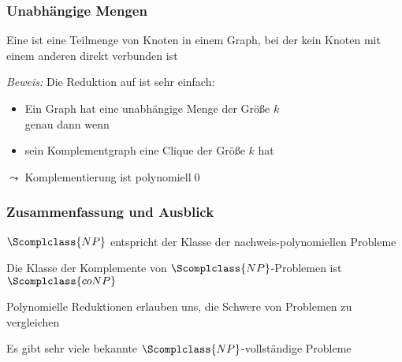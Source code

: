 \documentclass[aspectratio=1610,onlymath]{beamer}
\begin{document}
\begin{frame}\frametitle{Unabhängige Mengen}

Eine  ist eine Teilmenge von Knoten in einem Graph, bei der kein
Knoten mit einem anderen direkt verbunden ist\medskip

\medskip\pause

\pause

\emph{Beweis:} Die Reduktion auf  ist sehr einfach:
\begin{itemize}
\item Ein Graph hat eine unabhängige Menge der Größe $k$\\
genau dann wenn
\item sein Komplementgraph eine Clique der Größe $k$ hat
\end{itemize}
$\leadsto$ Komplementierung ist polynomiell\qed

\end{frame}


\begin{frame}\frametitle{Zusammenfassung und Ausblick}

$\Scomplclass{NP}$ entspricht der Klasse der nachweis-polynomiellen Probleme
\bigskip

Die Klasse der Komplemente von $\Scomplclass{NP}$-Problemen ist $\Scomplclass{coNP}$\bigskip

Polynomielle Reduktionen erlauben uns, die Schwere von Problemen zu vergleichen
\bigskip

Es gibt sehr viele bekannte $\Scomplclass{NP}$-vollständige Probleme\bigskip


\end{frame}

% 
% 
% 
% 
% 
% 
\end{document}
